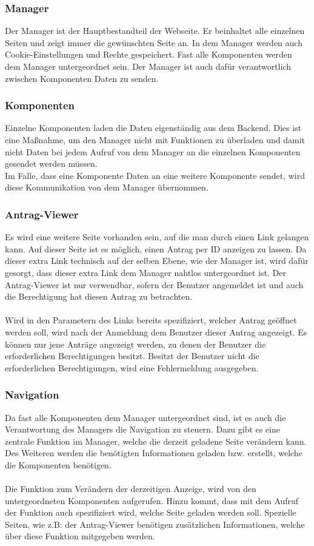 \subsubsection{Manager}
Der Manager ist der Hauptbestandteil der Webseite. Er beinhaltet alle einzelnen Seiten und zeigt immer die gewünschten Seite an. In dem Manager werden auch Cookie-Einstellungen und Rechte gespeichert. Fast alle Komponenten werden dem Manager untergeordnet sein. Der Manager ist auch dafür verantwortlich zwischen Komponenten Daten zu senden.

\subsubsection{Komponenten}
Einzelne Komponenten laden die Daten eigenständig aus dem Backend. Dies ist eine Maßnahme, um den Manager nicht mit Funktionen zu überladen und damit nicht Daten bei jedem Aufruf von dem Manager an die einzelnen Komponenten gesendet werden müssen.\\
Im Falle, dass eine Komponente Daten an eine weitere Komponente sendet, wird diese Kommunikation von dem Manager übernommen.

\subsubsection{Antrag-Viewer}
Es wird eine weitere Seite vorhanden sein, auf die man durch einen Link gelangen kann. Auf dieser Seite ist es möglich, einen Antrag per ID anzeigen zu lassen. Da dieser extra Link technisch auf der selben Ebene, wie der Manager ist, wird dafür gesorgt, dass dieser extra Link dem Manager nahtlos untergeordnet ist. Der Antrag-Viewer ist nur verwendbar, sofern der Benutzer angemeldet ist und auch die Berechtigung hat diesen Antrag zu betrachten.
\\\\
Wird in den Parametern des Links bereits spezifiziert, welcher Antrag geöffnet werden soll, wird nach der Anmeldung dem Benutzer dieser Antrag angezeigt. Es können nur jene Anträge angezeigt werden, zu denen der Benutzer die erforderlichen Berechtigungen besitzt. Besitzt der Benutzer nicht die erforderlichen Berechtigungen, wird eine Fehlermeldung ausgegeben.

\subsubsection{Navigation}
Da fast alle Komponenten dem Manager untergeordnet sind, ist es auch die Verantwortung des Managers die Navigation zu steuern. Dazu gibt es eine zentrale Funktion im Manager, welche die derzeit geladene Seite verändern kann. Des Weiteren werden die benötigten Informationen geladen bzw. erstellt, welche die Komponenten benötigen.
\\\\
Die Funktion zum Verändern der derzeitigen Anzeige, wird von den untergeordneten Komponenten aufgerufen. Hinzu kommt, dass mit dem Aufruf der Funktion auch spezifiziert wird, welche Seite geladen werden soll. Spezielle Seiten, wie z.B: der Antrag-Viewer benötigen zusätzlichen Informationen, welche über diese Funktion mitgegeben werden.

